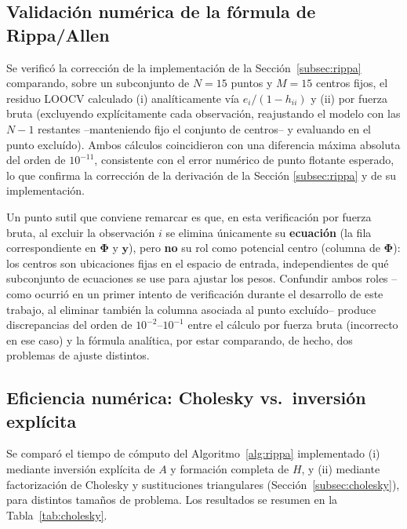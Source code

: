 \documentclass[11pt,a4paper]{article}
\newcommand{\Phimat}{\boldsymbol{\Phi}}
\newcommand{\yvec}{\mathbf{y}}
\begin{document}
\subsection{Validaci\'on num\'erica de la f\'ormula de Rippa/Allen}
\label{subsec:validacion_numerica}

Se verific\'o la correcci\'on de la implementaci\'on de la
Secci\'on~\ref{subsec:rippa} comparando, sobre un subconjunto de $N=15$ puntos
y $M=15$ centros fijos, el residuo LOOCV calculado (i) anal\'iticamente v\'ia
$e_i/(1-h_{ii})$ y (ii) por fuerza bruta (excluyendo expl\'icitamente cada
observaci\'on, reajustando el modelo con las $N-1$ restantes --manteniendo
fijo el conjunto de centros-- y evaluando en el punto exclu\'ido). Ambos
c\'alculos coincidieron con una diferencia m\'axima absoluta del orden de
$10^{-11}$, consistente con el error num\'erico de punto flotante esperado, lo
que confirma la correcci\'on de la derivaci\'on de la Secci\'on
\ref{subsec:rippa} y de su implementaci\'on.

Un punto sutil que conviene remarcar es que, en esta verificaci\'on por fuerza
bruta, al excluir la observaci\'on $i$ se elimina \'unicamente su
\textbf{ecuaci\'on} (la fila correspondiente en $\Phimat$ y $\yvec$), pero
\textbf{no} su rol como potencial centro (columna de $\Phimat$): los centros
son ubicaciones fijas en el espacio de entrada, independientes de qu\'e
subconjunto de ecuaciones se use para ajustar los pesos. Confundir ambos roles
--como ocurri\'o en un primer intento de verificaci\'on durante el desarrollo
de este trabajo, al eliminar tambi\'en la columna asociada al punto
exclu\'ido-- produce discrepancias del orden de $10^{-2}$--$10^{-1}$ entre el
c\'alculo por fuerza bruta (incorrecto en ese caso) y la f\'ormula anal\'itica,
por estar comparando, de hecho, dos problemas de ajuste distintos.

\subsection{Eficiencia num\'erica: Cholesky vs.\ inversi\'on expl\'icita}

Se compar\'o el tiempo de c\'omputo del Algoritmo~\ref{alg:rippa} implementado
(i) mediante inversi\'on expl\'icita de $A$ y formaci\'on completa de $H$, y
(ii) mediante factorizaci\'on de Cholesky y sustituciones triangulares
(Secci\'on~\ref{subsec:cholesky}), para distintos tama\~nos de problema. Los
resultados se resumen en la Tabla~\ref{tab:cholesky}.
\end{document}
